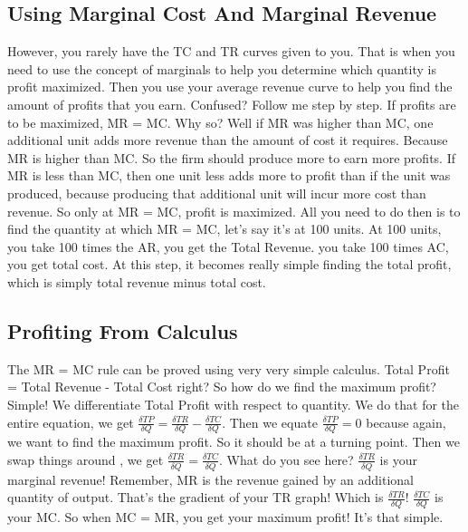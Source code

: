 \subsection{Using Marginal Cost And Marginal Revenue}
However, you rarely have the TC and TR curves given to you. That is when you need to use the concept of marginals to help you determine which quantity is profit maximized. Then you use your average revenue curve to help you find the amount of profits that you earn. Confused? Follow me step by step. If profits are to be maximized, MR = MC. Why so? Well if MR was higher than MC, one additional unit adds more revenue than the amount of cost it requires. Because MR is higher than MC. So the firm should produce more to earn more profits. If MR is less than MC, then one unit less adds more to profit than if the unit was produced, because producing that additional unit will incur more cost than revenue. So only at MR = MC, profit is maximized. All you need to do then is to find the quantity at which MR = MC, let's say it's at 100 units. At 100 units, you take 100 times the AR, you get the Total Revenue. you take 100 times AC, you get total cost. At this step, it becomes really simple finding the total profit, which is simply total revenue minus total cost.
\subsection{Profiting From Calculus}
The MR = MC rule can be proved using very very simple calculus. Total Profit = Total Revenue - Total Cost right? So how do we find the maximum profit? Simple! We differentiate Total Profit with respect to quantity. We do that for the entire equation, we get $\frac{\delta TP}{\delta Q} = \frac{\delta TR}{\delta Q} - \frac{\delta TC}{\delta Q}$. Then we equate $\frac{\delta TP}{\delta Q} = 0$ because again, we want to find the maximum profit. So it should be at a turning point. Then we swap things around , we get $\frac{\delta TR}{\delta Q} = \frac{\delta TC}{\delta Q}$. What do you see here? $\frac{\delta TR}{\delta Q}$ is your marginal revenue! Remember, MR is the revenue gained by an additional quantity of output. That's the gradient of your TR graph! Which is $\frac{\delta TR}{\delta Q}$! $\frac{\delta TC}{\delta Q}$ is your MC. So when MC = MR, you get your maximum profit! It's that simple.
